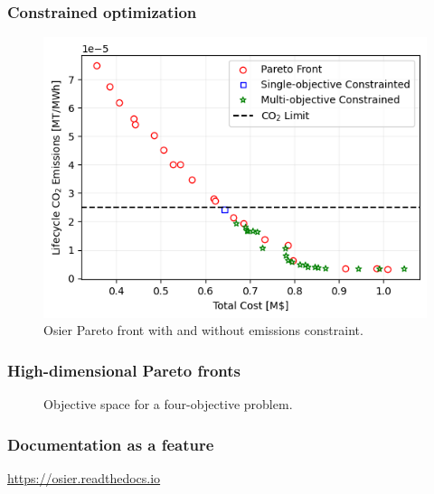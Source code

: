 \begin{frame}
    \frametitle{Constrained optimization}

        \begin{figure}
            \centering
            \includegraphics[width=0.75\columnwidth]{images/osier_constraint.png}
            \caption{Osier Pareto front with and without emissions constraint.}
        \end{figure}
\end{frame}

\begin{frame}
    \frametitle{High-dimensional Pareto fronts}
    \begin{figure}
        \centering
        \resizebox{\columnwidth}{!}{}
        \caption{Objective space for a four-objective problem.}
        \label{fig:4-obj-space}
    \end{figure}
\end{frame}


\begin{frame}
    \frametitle{Documentation as a feature}
    \url{https://osier.readthedocs.io}
\end{frame}


